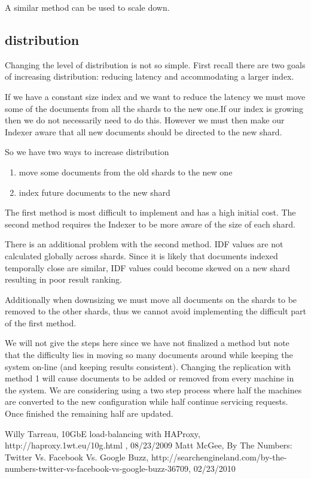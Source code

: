 \documentclass{article}
\begin{document}
A similar method can be used to scale down.

\subsection{distribution}
Changing the level of distribution is not so simple. First recall
there are two goals of increasing distribution: reducing latency and
accommodating a larger index.

If we have a constant size index and we want to reduce the latency we
must move some of the documents from all the shards to the new one.If
our index is growing then we do not necessarily need to do
this. However we must then make our Indexer aware that all new
documents should be directed to the new shard.

So we have two ways to increase distribution

\begin{enumerate}
\item move some documents from the old shards to the new one

\item index future documents to the new shard
\end{enumerate}

The first method is most difficult to implement and has a high initial
cost. The second method requires the Indexer to be more aware of the
size of each shard. 

There is an additional problem with the second method. IDF values are
not calculated globally across shards. Since it is likely that
documents indexed temporally close are similar, IDF values could become
skewed on a new shard resulting in poor result ranking.

Additionally when downsizing we must move all documents on the shards
to be removed to the other shards, thus we cannot avoid implementing
the difficult part of the first method.

We will not give the steps here since we have not finalized a method
but note that the difficulty lies in moving so many documents around
while keeping the system on-line (and keeping results
consistent). Changing the replication with method 1 will cause
documents to be added or removed from every machine in the system. We
are considering using a two step process where half the machines are
converted to the new configuration while half continue servicing
requests. Once finished the remaining half are updated.




\begin{thebibliography}{9}
    Willy Tarreau, 
    10GbE load-balancing with HAProxy,
    http://haproxy.1wt.eu/10g.html ,
    08/23/2009
    Matt McGee,
    By The Numbers: Twitter Vs. Facebook Vs. Google Buzz,
    http://searchengineland.com/by-the-numbers-twitter-vs-facebook-vs-google-buzz-36709,
    02/23/2010
\end{thebibliography}
\end{document}
